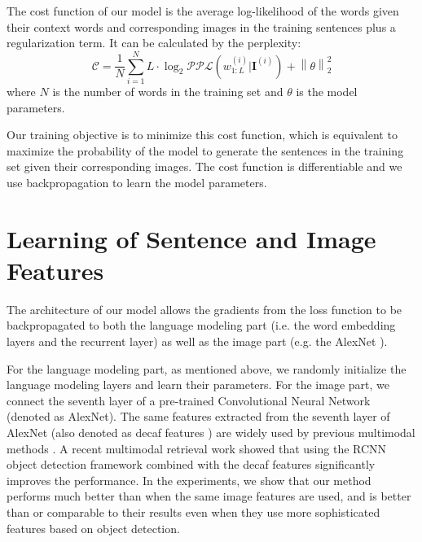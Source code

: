 The cost function of our model is the average log-likelihood of the words given their context words and corresponding images in the training sentences plus a regularization term.
It can be calculated by the perplexity:
\begin{equation}
\mathcal{C} = \frac{1}{N} \sum_{i=1}^{N} L \cdot \log_2 \mathcal{PPL}(w_{1:L}^{(i)}|\mathbf{I}^{(i)}) + \left \| \theta \right \|_2^2
\end{equation}
where $N$ is the number of words in the training set and $\theta$ is the model parameters.

Our training objective is to minimize this cost function, which is equivalent to maximize the probability of the model to generate the sentences in the training set given their corresponding images.
The cost function is differentiable and we use backpropagation to learn the model parameters.

\section{Learning of Sentence and Image Features}
\label{sec:ImgSenFeat}

The architecture of our model allows the gradients from the loss function to be backpropagated to both the language modeling part (i.e. the word embedding layers and the recurrent layer) as well as the image part (e.g. the AlexNet \cite{krizhevsky2012imagenet}).

For the language modeling part, as mentioned above, we randomly initialize the language modeling layers and learn their parameters. For the image part, we connect the seventh layer of a pre-trained Convolutional Neural Network \cite{krizhevsky2012imagenet,donahue2013decaf} (denoted as AlexNet).
The same features extracted from the seventh layer of AlexNet (also denoted as decaf features \cite{donahue2013decaf}) are widely used by previous multimodal methods \cite{kiros2013multimodal,frome2013devise,karpathy2014fragment,socher2014grounded}.
A recent multimodal retrieval work \cite{karpathy2014fragment} showed that using the RCNN object detection framework \cite{girshick2014rcnn} combined with the decaf features significantly improves the performance.
In the experiments, we show that our method performs much better than \cite{karpathy2014fragment} when the same image features are used, and is better than or comparable to their results even when they use more sophisticated features based on object detection.

